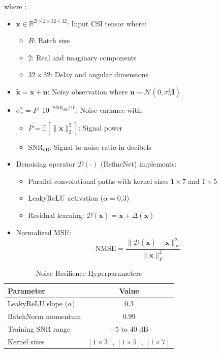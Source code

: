 \documentclass[lettersize,journal]{IEEEtran}
\begin{document}
where :
\begin{itemize}
	\item $\mathbf{x} \in \mathbb{R}^{B \times 2 \times 32 \times 32}$: Input CSI tensor where:
	\begin{itemize}
		\item $B$: Batch size
		\item $2$: Real and imaginary components
		\item $32 \times 32$: Delay and angular dimensions
	\end{itemize}
	
	\item $\tilde{\mathbf{x}} = \mathbf{x} + \mathbf{n}$: Noisy observation where $\mathbf{n} \sim \mathcal{N}(0,\sigma_n^2\mathbf{I})$
	
	\item $\sigma_n^2 = P \cdot 10^{-\text{SNR}_{\text{dB}}/10}$: Noise variance with:
	\begin{itemize}
		\item $P = \mathbb{E}[\|\mathbf{x}\|_2^2]$: Signal power
		\item $\text{SNR}_{\text{dB}}$: Signal-to-noise ratio in decibels
	\end{itemize}
	
	\item Denoising operator $\mathcal{D}(\cdot)$ (RefineNet) implements:
	\begin{itemize}
		\item Parallel convolutional paths with kernel sizes $1\times7$ and $1\times5$
		\item LeakyReLU activation ($\alpha=0.3$)
		\item Residual learning: $\mathcal{D}(\tilde{\mathbf{x}}) = \tilde{\mathbf{x}} + \Delta(\tilde{\mathbf{x}})$
	\end{itemize}
	
	\item Normalized MSE:
	\begin{equation}
		\text{NMSE} = \frac{\|\mathcal{D}(\tilde{\mathbf{x}}) - \mathbf{x}\|_F^2}{\|\mathbf{x}\|_F^2}
	\end{equation}
\end{itemize}

\begin{table}[ht]
	\centering
	\caption{Noise Resilience Hyperparameters}
	\label{tab:noise_params}
	\begin{tabular}{lc}
		\toprule
		Parameter & Value \\
		\midrule
		LeakyReLU slope ($\alpha$) & 0.3 \\
		BatchNorm momentum & 0.99 \\
		Training SNR range & $-5$ to $40$ dB \\
		Kernel sizes & $[1\times3]$, $[1\times5]$, $[1\times7]$ \\
		\bottomrule
	\end{tabular}
\end{table}
\end{document}
